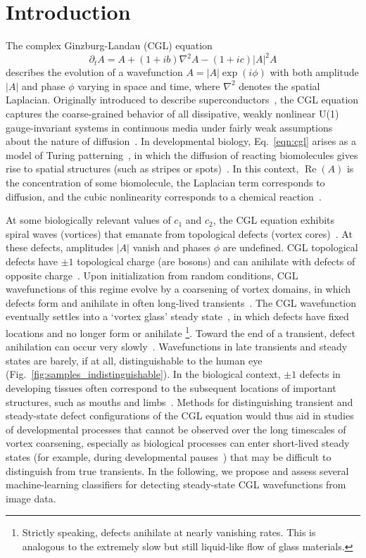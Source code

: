 \documentclass[nofootinbib,pre,superscriptaddress,twocolumn,longbibliography,floatfix]{revtex4-2}
\DeclareMathOperator{\realpart}{Re}
\begin{document}
\section{Introduction}
The complex Ginzburg-Landau (CGL) equation
\begin{equation}
    \partial_t A = A + (1+ib)\nabla^2 A-(1+ic)|A|^2 A
    \label{eqn:cgl}
\end{equation}
describes the evolution of a wavefunction $A=|A|\exp(i\phi)$
with both amplitude $|A|$ and phase $\phi$ varying in space and time,
where $\nabla^2$ denotes the spatial Laplacian.
Originally introduced to describe superconductors~\cite{ginzburg1950k},
the CGL equation captures the coarse-grained behavior of all dissipative,
weakly nonlinear U(1) gauge-invariant systems in continuous media under fairly weak assumptions about the nature of diffusion~\cite{aranson2002world}.
In developmental biology, Eq.~\ref{eqn:cgl} arises as a model of Turing patterning~\cite{kuramoto1984chemical},
in which the diffusion of reacting biomolecules gives rise to spatial structures
(such as stripes or spots)~\cite{turing1952chemical}.
In this context, $\realpart(A)$ is the concentration of some biomolecule,
the Laplacian term corresponds to diffusion, and the cubic nonlinearity corresponds to a chemical reaction~\cite{wigbers2021hierarchy}. 

At some biologically relevant values of $c_1$ and $c_2$,
the CGL equation exhibits spiral waves (vortices) that emanate from topological defects (vortex cores)~\cite{tan2020topological}.
At these defects, amplitudes $|A|$ vanish and phases $\phi$ are undefined.
CGL topological defects have $\pm 1$ topological charge (are bosons)
and can anihilate with defects of opposite charge~\cite{liu2021topological}.
Upon initialization from random conditions,
CGL wavefunctions of this regime evolve by a coarsening of vortex domains,
in which defects form and anihilate in often long-lived transients~\cite{chate1996phase}.
The CGL wavefunction eventually settles into a `vortex glass' steady state~\cite{huber1992nucleation},
in which defects have fixed locations and no longer form or anihilate
\footnote{Strictly speaking, defects anihilate at nearly vanishing rates.
This is analogous to the extremely slow but still liquid-like flow of glass materials.}.
Toward the end of a transient, defect anihilation can occur very slowly~\cite{liu2021topological}.
Wavefunctions in late transients and steady states are barely, if at all, distinguishable to the human eye (Fig.~\ref{fig:samples_indistinguishable}).
In the biological context, $\pm 1$ defects in developing tissues often correspond to the subsequent locations of important structures,
such as mouths and limbs~\cite{guillamat2022integer}.
Methods for distinguishing transient and steady-state defect configurations of the CGL equation
would thus aid in studies of developmental processes that cannot be observed over the long timescales of vortex coarsening,
especially as biological processes can enter short-lived steady states (for example, during developmental pauses~\cite{vanglist2020time}) that may be difficult to distinguish from true transients.
In the following, we propose and assess several machine-learning classifiers for detecting steady-state CGL wavefunctions from image data. 
\end{document}
